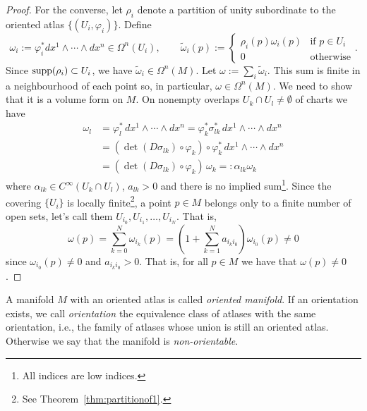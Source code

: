\begin{proof}
	For the converse, let $\rho_i$ denote a partition of unity subordinate to the oriented atlas $\{(U_i, \varphi_i)\}$.
	Define
	\begin{equation}
		\omega_i := \varphi_i^* dx^1\wedge\cdots\wedge dx^n \in \Omega^n(U_i)
		, \qquad
		\widetilde \omega_i(p) := \begin{cases}
			\rho_i(p)\omega_i(p) & \mbox{if } p\in U_i \\
			0                    & \mbox{otherwise}
		\end{cases}.
	\end{equation}
	Since $\operatorname{supp}(\rho_i) \subset U_i$, we have $\widetilde\omega_i\in\Omega^n(M)$.
	Let $\omega := \sum_i \widetilde \omega_i$. This sum is finite in a neighbourhood of each point so, in particular, $\omega \in \Omega^n(M)$. We need to show that it is a volume form on $M$.
	On nonempty overlaps $U_k \cap U_l \neq \emptyset$ of charts we have
	\begin{align}
		\omega_l & = \varphi_l^*\, dx^1\wedge\cdots\wedge dx^n = \varphi_k^* \sigma_{lk}^*\, dx^1 \wedge\cdots\wedge dx^n \\
		         & = (\det(D\sigma_{lk})\circ \varphi_k)\circ \varphi^*_k\, dx^1\wedge\cdots\wedge dx^n                   \\
		         & = (\det(D\sigma_{lk})\circ \varphi_k)\, \omega_k =: \alpha_{lk} \omega_k \label{form:cov}
	\end{align}
	where $\alpha_{lk}\in C^{\infty}(U_k\cap U_l)$, $a_{lk} > 0$ and there is no implied sum\footnote{All indices are low indices.}.
	Since the covering $\{U_i\}$ is locally finite\footnote{See Theorem~\ref{thm:partitionof1}.}, a point $p\in M$ belongs only to a finite number of open sets, let's call them $U_{i_0}, U_{i_1}, \ldots, U_{i_N}$. That is,
	\begin{equation}
		\omega(p) = \sum_{k=0}^N \omega_{i_k}(p) = \left( 1 + \sum_{k = 1}^N a_{i_k i_0} \right) \omega_{i_0}(p) \neq 0
	\end{equation}
	since $\omega_{i_0}(p) \neq 0$ and $a_{i_k i_0} > 0$.
	That is, for all $p\in M$ we have that $\omega(p) \neq 0$.
\end{proof}


\begin{definition}
	A manifold $M$ with an oriented atlas is called \emph{oriented manifold}.
	If an orientation exists, we call \emph{orientation} the equivalence class of atlases with the same orientation, i.e., the family of atlases whose union is still an oriented atlas.
	Otherwise we say that the manifold is \emph{non-orientable}.
\end{definition}

